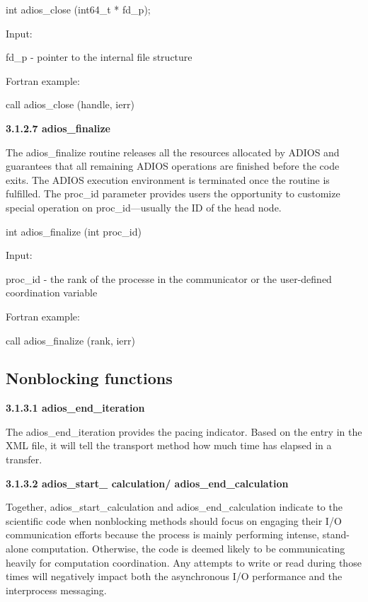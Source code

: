 \leftskip=22pt
int adios\_close (int64\_t * fd\_p);

Input: 

fd\_p - pointer to the internal file structure

\leftskip=22pt
Fortran example: 

\leftskip=22pt
call adios\_close (handle, ierr)

\leftskip=0pt
\textbf{3.1.2.7 adios\_finalize}

The adios\_finalize routine releases all the resources allocated by ADIOS and guarantees 
that all remaining ADIOS operations are finished before the code exits. The ADIOS 
execution environment is terminated once the routine is fulfilled. The proc\_id 
parameter provides users the opportunity to customize special operation on proc\_id---usually 
the ID of the head node. 

\leftskip=22pt
int adios\_finalize (int proc\_id)

\leftskip=22pt
Input: 

\leftskip=40pt
proc\_id - the rank of the processe in the communicator or the user-defined coordination 
variable

\leftskip=22pt
Fortran example: 

call adios\_finalize (rank, ierr)\label{HToc84890237}\label{HToc212016613}\label{HToc212016855}\label{HToc182553351}

\subsection{Nonblocking functions}

\leftskip=0pt
\textbf{3.1.3.1 adios\_end\_iteration}

The adios\_end\_iteration provides the pacing indicator. Based on the entry in 
the XML file, it will tell the transport method how much time has elapsed in a 
transfer.

\textbf{3.1.3.2 adios\_start\_ calculation/ adios\_end\_calculation}

Together, adios\_start\_calculation and adios\_end\_calculation indicate to the 
scientific code when nonblocking methods should focus on engaging their I/O communication 
efforts because the process is mainly performing intense, stand-alone computation. 
Otherwise, the code is deemed likely to be communicating heavily for computation 
coordination. Any attempts to write or read during those times will negatively 
impact both the asynchronous I/O performance and the interprocess messaging.\label{HToc212016614}\label{HToc212016856}\label{HToc84890238}\label{HToc182553352}

